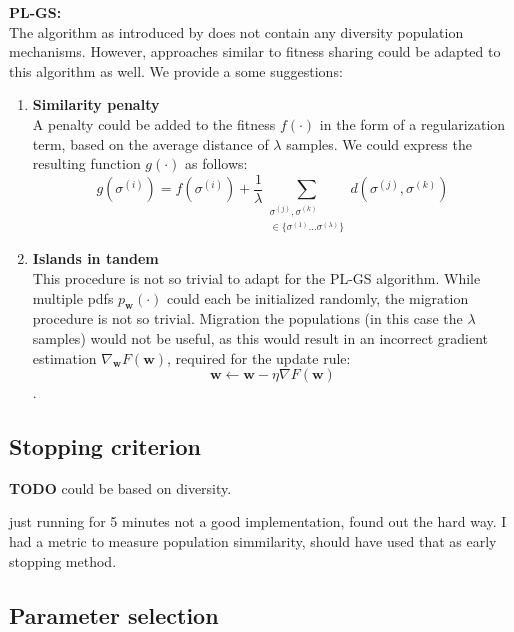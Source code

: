 \documentclass[a4paper,10pt]{article}
\newcommand{\ReplaceMe}[1]{{\color{blue}#1}}
\begin{document}
	\textbf{PL-GS:} \\
	The algorithm as introduced by \citeauthor{santucci_gradient_2020} does not contain any diversity population mechanisms. However, approaches similar to fitness sharing could be adapted to this algorithm as well. We provide a some suggestions:
	\begin{enumerate}
		\item \textbf{Similarity penalty} \\ 
		A penalty could be added to the fitness $f(\cdot)$ in the form of a regularization term, based on the average distance of $\lambda$ samples. We could express the resulting function $g(\cdot)$ as follows:
		$$
		g(\sigma^{(i)}) = f(\sigma^{(i)}) + \frac{1}{\lambda} \sum_{\substack{\sigma^{(j)}, \sigma^{(k)} \\ \in \{ \sigma^{(1)} \dots \sigma^{(\lambda)} \}}} d(\sigma^{(j)}, \sigma^{(k)})
		$$
		\item \textbf{Islands in tandem} \\
		This procedure is not so trivial to adapt for the PL-GS algorithm. While multiple pdfs $p_\mathbf{w}(\cdot)$ could each be initialized randomly, the migration procedure is not so trivial. Migration the populations (in this case the $\lambda$ samples) would not be useful, as this would result in an incorrect gradient estimation $\nabla_{\mathbf{w}} F\left(\mathbf{w}\right)$, required for the update rule:
		$$\mathbf{w} \leftarrow \mathbf{w} - \eta \nabla F\left(\mathbf{w}\right)$$.
		
		
	\end{enumerate}
	


\subsection{Stopping criterion}

\textbf{TODO}
could be based on diversity.


just running for 5 minutes not a good implementation, found out the hard way. I had a metric to measure population simmilarity, should have used that as early stopping method.

\subsection{Parameter selection}
	
\end{document}
